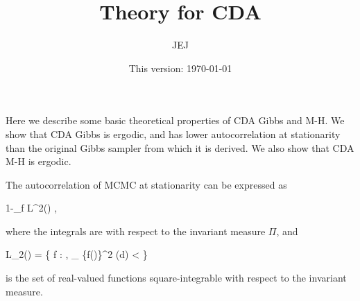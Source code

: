 \documentclass[a4paper,11pt]{article}%
\theoremstyle{example} \theoremstyle{remark} \theoremstyle{lemma}
\theoremstyle{definition} \theoremstyle{corol}
\theoremstyle{proposition} \theoremstyle{condition}
\theoremstyle{assumption}
\newcommand{\bb}[1]{\mathbb{#1}}
\def\var{{\mbox{var}}}
\newcommand{\1}{\\[1ex]}
\newcommand{\2}{\\[2ex]}
\newcommand{\3}{\\[3ex]}
\newcommand{\4}{\\[4ex]}
\def \be{\begin{equs}}
\def \ee{\end{equs}}
\begin{document}
\title{\Large Theory for CDA }
\date{\normalsize This version: \today}
\author{JEJ}
\maketitle

Here we describe some basic theoretical properties of CDA Gibbs and M-H. We show that CDA Gibbs is ergodic, and has lower autocorrelation at stationarity than the original Gibbs sampler from which it is derived. We also show that CDA M-H is ergodic. 

The autocorrelation of MCMC at stationarity can be expressed as 
\be
1-\inf_{f \in L^2(\Pi)} \frac{\bb E[\var(\theta \mid z)]}{\var(\theta)},
\ee
where the integrals are with respect to the invariant measure $\Pi$, and 
\be
L_2(\Pi) = \left\{ f : \Theta \to \bb R, \int_{\theta \in \Theta} \{f(\theta)\}^2 \Pi(d\theta) < \infty \right\} 
\ee
is the set of real-valued functions square-integrable with respect to the invariant measure. 
\end{document}
